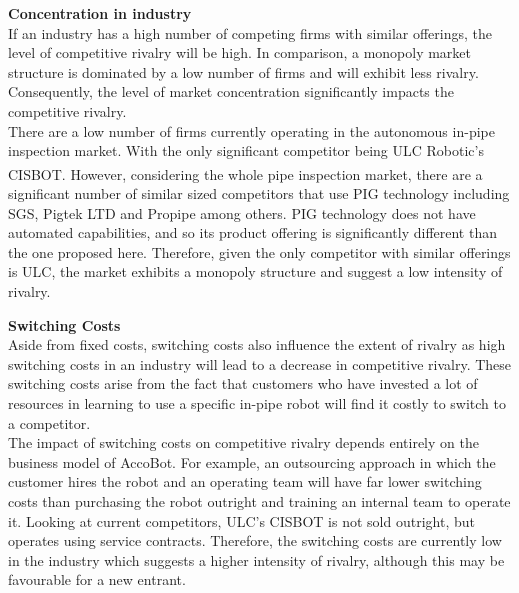 \documentclass[11pt]{article}		%
\newcommand{\supercite}[1]{\textsuperscript{\cite{#1}}}		%
\begin{document}
		        \textbf{Concentration in industry}
		        \\
		        If an industry has a high number of competing firms with similar offerings, the level of competitive rivalry will be high. In comparison, a monopoly market structure is dominated by a low number of firms and will exhibit less rivalry. Consequently, the level of market concentration significantly impacts the competitive rivalry.
		        \\
                \hspace*{2ex}There are a low number of firms currently operating in the autonomous in-pipe inspection market. With the only significant competitor being ULC Robotic’s CISBOT\supercite{cisbotbeast}. However, considering the whole pipe inspection market, there are a significant number of similar sized competitors that use PIG technology including SGS, Pigtek LTD and Propipe among others. PIG technology does not have automated capabilities, and so its product offering is significantly different than the one proposed here. Therefore, given the only competitor with similar offerings is ULC, the market exhibits a monopoly structure and suggest a low intensity of rivalry.
		        
		        \textbf{Switching Costs}
		        \\
		        Aside from fixed costs, switching costs also influence the extent of rivalry as high switching costs in an industry will lead to a decrease in competitive rivalry. These switching costs arise from the fact that customers who have invested a lot of resources in learning to use a specific in-pipe robot will find it costly to switch to a competitor. 
		        \\
		        \hspace*{2ex}The impact of switching costs on competitive rivalry depends entirely on the business model of AccoBot. For example, an outsourcing approach in which the customer hires the robot and an operating team will have far lower switching costs than purchasing the robot outright and training an internal team to operate it. Looking at current competitors, ULC’s CISBOT is not sold outright, but operates using service contracts. Therefore, the switching costs are currently low in the industry which suggests a higher intensity of rivalry, although this may be favourable for a new entrant. 
		
\end{document}
